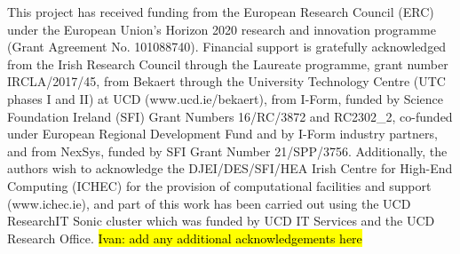 \documentclass[sn-mathphys,Numbered,draft]{sn-jnl}%
\begin{document}
\backmatter

This project has received funding from the European Research Council (ERC) under the European Union’s Horizon 2020 research and innovation programme (Grant Agreement No. 101088740).
Financial support is gratefully acknowledged from the Irish Research Council through the Laureate programme, grant number IRCLA/2017/45, from Bekaert through the University Technology Centre (UTC phases I and II) at UCD (www.ucd.ie/bekaert), from I-Form, funded by Science Foundation Ireland (SFI) Grant Numbers 16/RC/3872 and {RC2302\_2}, co-funded under European Regional Development Fund and by I-Form industry partners, and from NexSys, funded by SFI Grant Number 21/SPP/3756.
Additionally, the authors wish to acknowledge the DJEI/DES/SFI/HEA Irish Centre for High-End Computing (ICHEC) for the provision of computational facilities and support (www.ichec.ie), and part of this work has been carried out using the UCD ResearchIT Sonic cluster which was funded by UCD IT Services and the UCD Research Office.
\hl{Ivan: add any additional acknowledgements here}



\newpage

%
%
%
%


\end{document}
